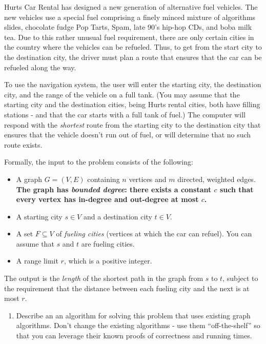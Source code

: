 \documentclass[12 pt, letterpaper]{hmcpset}
\begin{document}
\pagebreak

\begin{problem}
	Hurts Car Rental has designed a new generation of alternative fuel vehicles. The
new vehicles use a special fuel comprising a finely minced mixture of algorithms
slides, chocolate fudge Pop Tarts, Spam, late 90's hip-hop CDs, and boba milk
tea. Due to this rather unusual fuel requirement, there are only certain cities
in the country where the vehicles can be refueled. Thus, to get from the start
city to the destination city, the driver must plan a route that ensures that the
car can be refueled along the way. 

To use the navigation system, the user will enter the starting city, the destination
city, and the range of the vehicle on a full tank. (You may assume that
the starting city and the destination cities, being Hurts rental cities,
both have filling stations - and that the car starts with a full tank of
fuel.) The computer will respond with the {\em shortest} route from the
starting city to the destination city that ensures that the vehicle
doesn't run out of fuel, or will determine that no such route exists.

\vspace{0.5cm}

Formally, the input to the problem consists of the following:
\begin{itemize}
    \item A graph $G = (V, E)$ containing $n$ vertices and $m$ directed, weighted edges. \textbf{The graph has \emph{bounded degree}: there exists a constant $c$ such that every vertex has in-degree and out-degree at most $c$.}
    \item A starting city $s \in V$ and a destination city $t \in V$. 
    \item A set $F \subseteq V$ of \emph{fueling cities} (vertices at which the car can refuel). You can assume that $s$ and $t$ are fueling cities.
    \item A range limit $r$, which is a positive integer.
\end{itemize}

The output is the \emph{length} of the shortest path in the graph from $s$ to $t$, subject to the requirement that the distance between each fueling city and the next is at most $r$.

\begin{enumerate}
    \item Describe an an algorithm for solving this problem that uses existing graph algorithms. Don't change the existing algorithms - use them ``off-the-shelf'' so that you can leverage their known proofs of correctness and running times.
    

\end{enumerate}
\end{problem}
\end{document}
